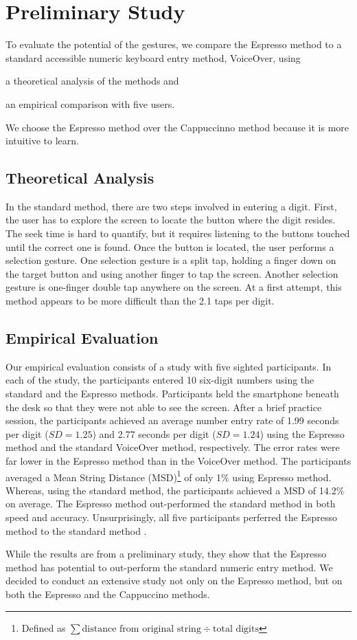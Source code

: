\section{Preliminary Study}
\label{sec:tapulator}

To evaluate the potential of the gestures, we compare the Espresso method to a standard accessible numeric keyboard entry method, VoiceOver, using 
  \begin{enumerate*}[(1) ]
    \item a theoretical analysis of the methods and 
    \item an empirical comparison with five users. 
  \end{enumerate*}
We choose the Espresso method over the Cappuccinno method because it is more intuitive to learn.

\subsection{Theoretical Analysis}
In the standard method, there are two steps involved in entering a digit. First, the user has to explore the screen to locate the button where the digit resides. The seek time is hard to quantify, but it requires listening to the buttons touched until the correct one is found. Once the button is located, the user performs a selection gesture. One selection gesture is a split tap, holding a finger down on the target button and using another finger to tap the screen. Another selection gesture is one-finger double tap anywhere on the screen. At a first attempt, this method appears to be more difficult than the 2.1 taps per digit.

\subsection{Empirical Evaluation}
Our empirical evaluation consists of a study with five sighted participants. In each of the study, the participants entered 10 six-digit numbers using the standard and the Espresso methods. Participants held the smartphone beneath the desk so that they were not able to see the screen. After a brief practice session, the participants achieved an average number entry rate of 1.99 seconds per digit ($SD = 1.25$) and 2.77 seconds per digit ($SD = 1.24$) using the Espresso method and the standard VoiceOver method, respectively. The error rates were far lower in the Espresso method than in the VoiceOver method. The participants averaged a Mean String Distance (MSD)\footnote{Defined as $\sum \mbox{distance from original string} \div \mbox{total digits} $} of only 1\% using Espresso method. Whereas, using the standard method, the participants achieved a MSD of 14.2\% on average. The Espresso method out-performed the standard method in both speed and accuracy. Unsurprisingly, all five participants perferred the Espresso method to the standard method \cite{Ruamviboonsuk:2012}.
\par
While the results are from a preliminary study, they show that the Espresso method has potential to out-perform the standard numeric entry method. We decided to conduct an extensive study not only on the Espresso method, but on both the Espresso and the Cappuccino methods.